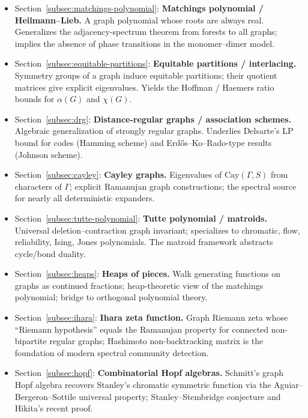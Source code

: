 \begin{itemize}
  \item Section~\ref{subsec:matchings-polynomial}: \textbf{Matchings polynomial / Heilmann--Lieb.} A
        graph polynomial whose roots are always real. Generalizes the
        adjacency-spectrum theorem from forests to all graphs;
        implies the absence of phase transitions in the
        monomer--dimer model.
  \item Section~\ref{subsec:equitable-partitions}: \textbf{Equitable partitions / interlacing.} Symmetry
        groups of a graph induce equitable partitions; their quotient
        matrices give explicit eigenvalues. Yields the Hoffman /
        Haemers ratio bounds for $\alpha(G)$ and $\chi(G)$.
  \item Section~\ref{subsec:drg}: \textbf{Distance-regular graphs / association schemes.}
        Algebraic generalization of strongly regular graphs.
        Underlies Delsarte's LP bound for codes (Hamming scheme) and
        Erd\H{o}s--Ko--Rado-type results (Johnson scheme).
  \item Section~\ref{subsec:cayley}: \textbf{Cayley graphs.} Eigenvalues of $\mathrm{Cay}(\Gamma, S)$
        from characters of $\Gamma$; explicit Ramanujan graph
        constructions; the spectral source for nearly all
        deterministic expanders.
  \item Section~\ref{subsec:tutte-polynomial}: \textbf{Tutte polynomial / matroids.} Universal
        deletion--contraction graph invariant; specializes to
        chromatic, flow, reliability, Ising, Jones polynomials. The
        matroid framework abstracts cycle/bond duality.
  \item Section~\ref{subsec:heaps}: \textbf{Heaps of pieces.} Walk generating functions on
        graphs as continued fractions; heap-theoretic view of the
        matchings polynomial; bridge to orthogonal polynomial theory.
  \item Section~\ref{subsec:ihara}: \textbf{Ihara zeta function.} Graph Riemann zeta whose
        ``Riemann hypothesis'' equals the Ramanujan property for
        connected non-bipartite regular graphs;
        Hashimoto non-backtracking matrix is the foundation of modern
        spectral community detection.
  \item Section~\ref{subsec:hopf}: \textbf{Combinatorial Hopf algebras.} Schmitt's graph
        Hopf algebra recovers Stanley's chromatic symmetric function
        via the Aguiar--Bergeron--Sottile universal property;
        Stanley--Stembridge conjecture and Hikita's recent proof.

\end{itemize}
